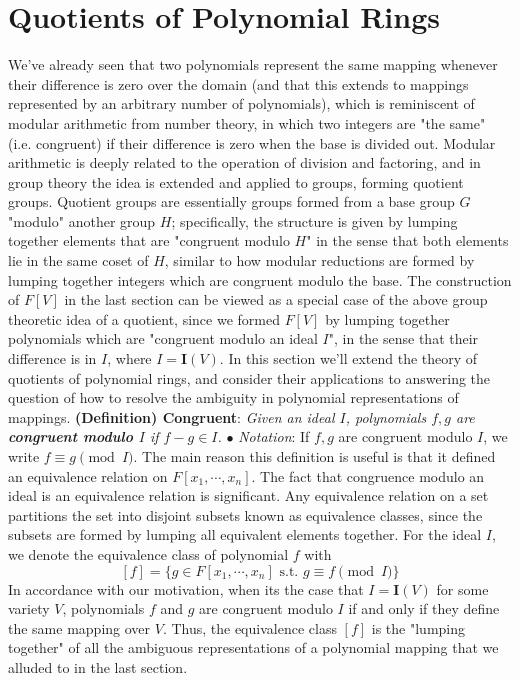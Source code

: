 \documentclass{article}
\newcommand*{\tb}{\textbf}
\newcommand*{\ti}{\textit}
\newcommand*{\n}{\newline}
\newcommand*{\nn}{\newline \newline}
\newcommand*{\No}{\indent \ensuremath{\bullet} \textit{Notation}: }
\newcommand*{\Fx}{\ensuremath{F[x_1, \cdots, x_n]}}
\newcommand*{\IV}{\ensuremath{\mathbf{I}(V)}}
\begin{document}
\section{Quotients of Polynomial Rings}
We've already seen that two polynomials represent the same mapping whenever their difference is zero over the domain (and that this extends to mappings represented by an arbitrary number of polynomials), which is reminiscent of modular arithmetic from number theory, in which two integers are "the same" (i.e. congruent) if their difference is zero when the base is divided out. Modular arithmetic is deeply related to the operation of division and factoring, and in group theory the idea is extended and applied to groups, forming quotient groups. Quotient groups are essentially groups formed from a base group $ G $ "modulo" another group $ H $; specifically, the structure is given by lumping together elements that are "congruent modulo $ H $" in the sense that both elements lie in the same coset of $ H $, similar to how modular reductions are formed by lumping together integers which are congruent modulo the base.
\n
The construction of $ F[V] $ in the last section can be viewed as a special case of the above group theoretic idea of a quotient, since we formed $ F[V] $ by lumping together polynomials which are "congruent modulo an ideal $ I $", in the sense that their difference is in $ I $, where $ I = \IV $. In this section we'll extend the theory of quotients of polynomial rings, and consider their applications to answering the question of how to resolve the ambiguity in polynomial representations of mappings.
\nn
\tb{(Definition) Congruent}: \ti{Given an ideal $ I $, polynomials $ f, g $ are \tb{congruent modulo $ I $} if $ f - g \in I $.}
\n
\No If $ f, g $ are congruent modulo $ I $, we write $ f \equiv g \pmod{I} $. The main reason this definition is useful is that it defined an equivalence relation on $ \Fx $.
\nn
The fact that congruence modulo an ideal is an equivalence relation is significant. Any equivalence relation on a set partitions the set into disjoint subsets known as equivalence classes, since the subsets are formed by lumping all equivalent elements together. For the ideal $ I $, we denote the equivalence class of polynomial $ f $ with
$$ [ f ] = \{ g \in \Fx \text{ s.t. } g \equiv f \pmod{I} \} $$
In accordance with our motivation, when its the case that $ I = \IV $ for some variety $ V $, polynomials $ f $ and $ g $ are congruent modulo $ I $ if and only if they define the same mapping over $ V $. Thus, the equivalence class $ [ f ] $ is the "lumping together" of all the ambiguous representations of a polynomial mapping that we alluded to in the last section.
\end{document}
